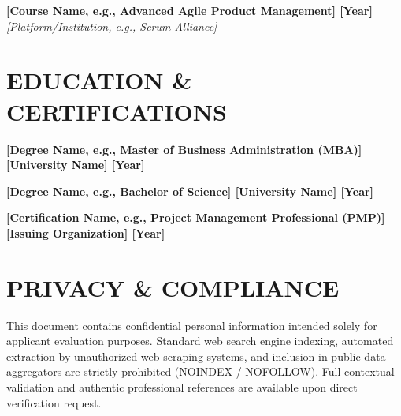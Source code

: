 \documentclass[10pt,a4paper]{article}
\newcommand{\resumeline}{\vspace{-8pt}\noindent\makebox[\linewidth]{\rule{\linewidth}{0.5pt}}\vspace{4pt}}
\begin{document}
	\vspace{6pt}
	
	\noindent \textbf{[Course Name, e.g., Advanced Agile Product Management] \textbar{} [Year]} \\
	\noindent \textit{[Platform/Institution, e.g., Scrum Alliance]}
	
	\section*{EDUCATION \& CERTIFICATIONS}
	\resumeline
	
	\noindent \textbf{[Degree Name, e.g., Master of Business Administration (MBA)] \textbar{} [University Name] \textbar{} [Year]} \\
	\vspace{2pt}
	
	\noindent \textbf{[Degree Name, e.g., Bachelor of Science] \textbar{} [University Name] \textbar{} [Year]} \\
	\vspace{2pt}
	
	\noindent \textbf{[Certification Name, e.g., Project Management Professional (PMP)] \textbar{} [Issuing Organization] \textbar{} [Year]}
	
	\section*{PRIVACY \& COMPLIANCE}
	\resumeline
	
	\noindent \small This document contains confidential personal information intended solely for applicant evaluation purposes. Standard web search engine indexing, automated extraction by unauthorized web scraping systems, and inclusion in public data aggregators are strictly prohibited (NOINDEX / NOFOLLOW). Full contextual validation and authentic professional references are available upon direct verification request.
	
\end{document}
